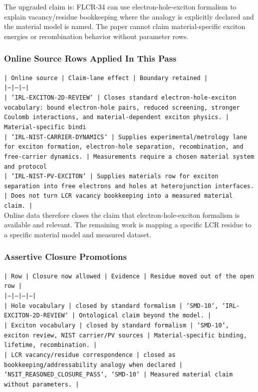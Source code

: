 \documentclass[11pt]{article}
\begin{document}
The upgraded claim is: FLCR-34 can use electron-hole-exciton formalism to explain vacancy/residue bookkeeping where the analogy is explicitly declared and the material model is named. The paper cannot claim material-specific exciton energies or recombination behavior without parameter rows.

\subsubsection*{Online Source Rows Applied In This Pass}

\noindent\texttt{| Online source | Claim-lane effect | Boundary retained |}\\
\noindent\texttt{|---|---|---|}\\
\noindent\texttt{| `IRL-EXCITON-2D-REVIEW` | Closes standard electron-hole-exciton vocabulary: bound electron-hole pairs, reduced screening, stronger Coulomb interactions, and material-dependent exciton physics. | Material-specific bindi}\\
\noindent\texttt{| `IRL-NIST-CARRIER-DYNAMICS` | Supplies experimental/metrology lane for exciton formation, electron-hole separation, recombination, and free-carrier dynamics. | Measurements require a chosen material system and protocol}\\
\noindent\texttt{| `IRL-NIST-PV-EXCITON` | Supplies materials row for exciton separation into free electrons and holes at heterojunction interfaces. | Does not turn LCR vacancy bookkeeping into a measured material claim. |}\\

Online data therefore closes the claim that electron-hole-exciton formalism is available and relevant. The remaining work is mapping a specific LCR residue to a specific material model and measured dataset.

\subsubsection*{Assertive Closure Promotions}

\noindent\texttt{| Row | Closure now allowed | Evidence | Residue moved out of the open row |}\\
\noindent\texttt{|---|---|---|---|}\\
\noindent\texttt{| Hole vocabulary | closed by standard formalism | `SMD-10`, `IRL-EXCITON-2D-REVIEW` | Ontological claim beyond the model. |}\\
\noindent\texttt{| Exciton vocabulary | closed by standard formalism | `SMD-10`, exciton review, NIST carrier/PV sources | Material-specific binding, lifetime, recombination. |}\\
\noindent\texttt{| LCR vacancy/residue correspondence | closed as bookkeeping/addressability analogy when declared | `NSIT\_REASONED\_CLOSURE\_PASS`, `SMD-10` | Measured material claim without parameters. |}\\
\end{document}
